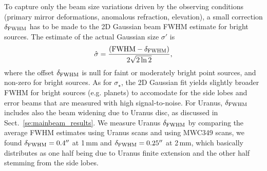 To capture only the beam size variations driven by the
observing conditions (primary mirror deformations, anomalous
refraction, elevation), a small correction $\delta_{\rm{FWHM}}$ has to be made to
the 2D Gaussian beam FWHM estimate for bright sources. The estimate of the
actual Gaussian size $\sigma '$ is
\begin{equation}
  \hat{\sigma} = \frac{(\rm{FWHM} - \delta_{\rm{FWHM}})}{2\sqrt{2 \ln{2}}}, 
\end{equation} 
where the offset $\delta_{\rm{FWHM}}$ is null for faint or moderately
bright point sources, and non-zero for bright sources.
As for $\sigma_\star$, the 2D Gaussian fit yields slightly broader
FWHM for bright sources (e.g. planets) to accomodate
for the side lobes and error beams that are measured with high signal-to-noise.
For Uranus, $\delta_{\rm{FWHM}}$ includes also the beam widening due
to Uranus disc, as discussed in Sect.~\ref{se:mainbeam_results}.
We measure Uranus $\delta_{\rm{FWHM}}$
by comparing the average %
FWHM estimates using Uranus
scans and using MWC349 scans, we found $\delta_{\rm{FWHM}} = 0.4''$ at
1\,mm and $\delta_{\rm{FWHM}} = 0.25''$ at 2\,mm, which basically
distributes as one half being due to Uranus finite extension and the
other half stemming from the side lobes.\\

